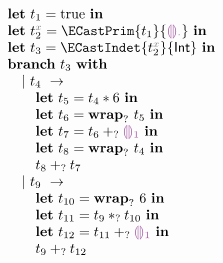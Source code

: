 


  \[\begin{array}{l}
    \ELet{t_1}{\ETrue} \EInn \\
    \ELet{\ENamed{2}{x}}{\ECastPrim{t_1}{\TCHole}} \EInn \\
    \ELet{t_3}{\ECastIndet{\ENamed{2}{x}}{\TCInt}} \EInn \\

    \EBranchWith{t_3} \\
      \Indent \EBranchBr{t_4}{} \\
        \Indent \Indent \ELet{t_5}{\ETimesPrim{t_4}{6}} \EInn \\
        \Indent \Indent \ELet{t_6}{\EWrapIndet{t_5}} \EInn \\
        \Indent \Indent \ELet{t_7}{\EPlusIndet{t_6}{\EEHole{1}}} \EInn \\
        \Indent \Indent \ELet{t_8}{\EWrapIndet{t_4}} \EInn \\
        \Indent \Indent \EPlusIndet{t_8}{t_7} \\
      \Indent \EBranchBr{t_{9}}{} \\
        \Indent \Indent \ELet{t_{10}}{\EWrapIndet{6}} \EInn \\
        \Indent \Indent \ELet{t_{11}}{\ETimesIndet{t_{9}}{t_{10}}} \EInn \\
        \Indent \Indent \ELet{t_{12}}{\EPlusIndet{t_{11}}{\EEHole{1}}} \EInn \\
        \Indent \Indent \EPlusIndet{t_{9}}{t_{12}}
  \end{array}\]


